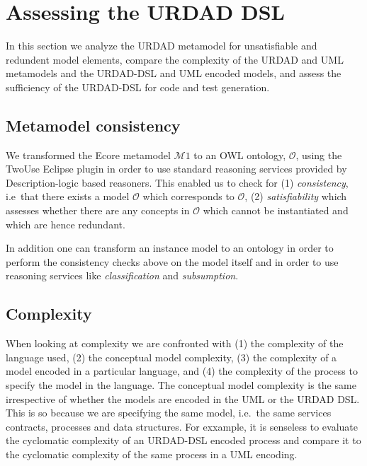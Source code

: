 \section{Assessing the URDAD DSL \label{sec:assessment}}

In this section we analyze the URDAD metamodel for unsatisfiable and redundent model elements, compare the complexity of the URDAD and UML metamodels and the URDAD-DSL and UML encoded models, and assess the sufficiency of the URDAD-DSL for code and test generation.


\subsection{Metamodel consistency}

We transformed the Ecore metamodel $\mathcal{M}1$ to an OWL ontology, $\mathcal{O}$, using the TwoUse \cite{parreiras_using_2010} Eclipse plugin in order to use standard reasoning services provided by Description-logic based reasoners. This enabled us to check for (1) \emph{consistency}, i.e\ that there exists a model $\mathcal{O}$ which corresponds to $\mathcal{O}$, (2) \emph{satisfiability} which assesses whether there are any concepts in $\mathcal{O}$ which cannot be instantiated and which are hence redundant.

In addition one can transform an instance model to an ontology in order to perform the consistency checks above on the model itself and in order to use reasoning services like \emph{classification} and \emph{subsumption}.


\subsection{Complexity}

When looking at complexity we are confronted with (1) the complexity of the language used, (2) the conceptual model complexity, (3) the complexity of a model encoded in a particular language, and (4) the complexity of the process to specify the model in the language. The conceptual model complexity is the same irrespective of whether the models are encoded in the UML or the URDAD DSL. This is so because we are specifying the same model, i.e.\ the same services contracts, processes and data structures. For exxample, it is senseless to evaluate the cyclomatic complexity \cite{mccabe_complexity_1976} of an URDAD-DSL encoded process and compare it to the cyclomatic complexity of the same process in a UML encoding.

